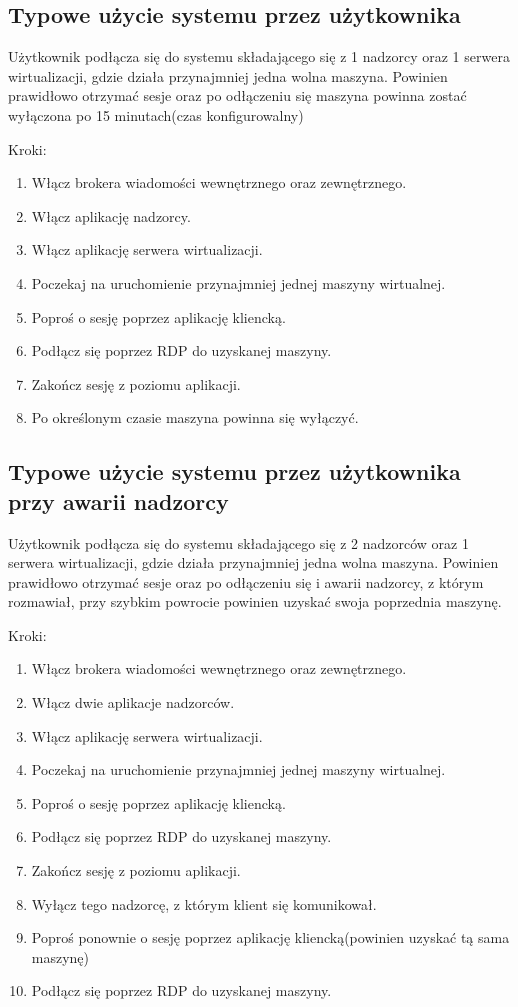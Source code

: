 \documentclass[12pt]{article}
\begin{document}
\subsection{Typowe użycie systemu przez użytkownika}
Użytkownik podłącza się do systemu składającego się z 1 nadzorcy oraz 1 serwera wirtualizacji, gdzie działa przynajmniej jedna wolna maszyna.
Powinien prawidłowo otrzymać sesje oraz po odłączeniu się maszyna powinna zostać wyłączona po 15 minutach(czas konfigurowalny)

Kroki:
\begin{enumerate}
	\item Włącz brokera wiadomości wewnętrznego oraz zewnętrznego.
	\item Włącz aplikację nadzorcy.
	\item Włącz aplikację serwera wirtualizacji.
	\item Poczekaj na uruchomienie przynajmniej jednej maszyny wirtualnej.
	\item Poproś o sesję poprzez aplikację kliencką.
	\item Podłącz się poprzez RDP do uzyskanej maszyny.
	\item Zakończ sesję z poziomu aplikacji.
	\item Po określonym czasie maszyna powinna się wyłączyć.
\end{enumerate}

\subsection{Typowe użycie systemu przez użytkownika przy awarii nadzorcy}
Użytkownik podłącza się do systemu składającego się z 2 nadzorców oraz 1 serwera wirtualizacji, gdzie działa przynajmniej jedna wolna maszyna.
Powinien prawidłowo otrzymać sesje oraz po odłączeniu się i awarii nadzorcy, z którym rozmawiał, przy szybkim powrocie powinien uzyskać swoja poprzednia maszynę.

Kroki:
\begin{enumerate}
	\item Włącz brokera wiadomości wewnętrznego oraz zewnętrznego.
	\item Włącz dwie aplikacje nadzorców.
	\item Włącz aplikację serwera wirtualizacji.
	\item Poczekaj na uruchomienie przynajmniej jednej maszyny wirtualnej.
	\item Poproś o sesję poprzez aplikację kliencką.
	\item Podłącz się poprzez RDP do uzyskanej maszyny.
	\item Zakończ sesję z poziomu aplikacji.
	\item Wyłącz tego nadzorcę, z którym klient się komunikował.
	\item Poproś ponownie o sesję poprzez aplikację kliencką(powinien uzyskać tą sama maszynę)
	\item Podłącz się poprzez RDP do uzyskanej maszyny.
\end{enumerate}
\end{document}
